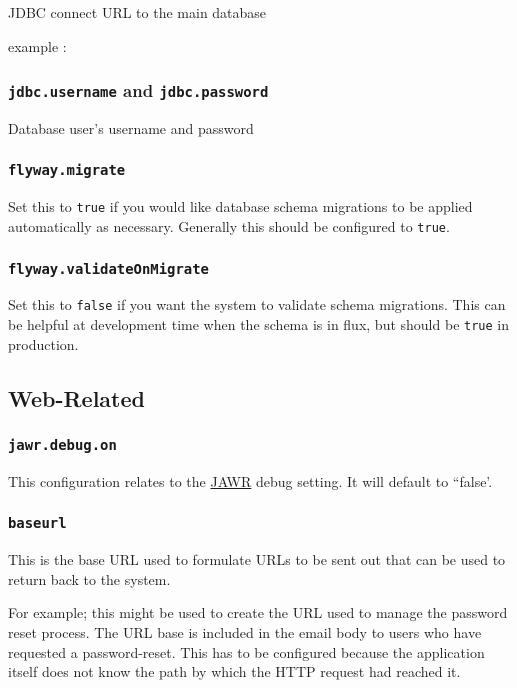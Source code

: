 JDBC connect URL to the main database

example : 

\subsubsection{{\tt jdbc.username} and {\tt jdbc.password}}

Database user's username and password

\subsubsection{\tt flyway.migrate}

Set this to {\tt true} if you would like database schema migrations to be applied automatically as necessary.  Generally this should be configured to {\tt true}.

\subsubsection{\tt flyway.validateOnMigrate}

Set this to {\tt false} if you want the system to validate schema migrations.  This can be helpful at development time when the schema is in flux, but should be {\tt true} in production.

\subsection{Web-Related}

\subsubsection{\tt jawr.debug.on}

This configuration relates to the \href{https://jawr.java.net/}{JAWR} debug setting.  It will default to ``false'.

\subsubsection{\tt baseurl}

This is the base URL used to formulate URLs to be sent out that can be used to return back to the system.

For example; this might be used to create the URL used to manage the password reset process.  The URL base is included in the email body to users who have requested a password-reset.  This has to be configured because the application itself does not know the path by which the HTTP request had reached it.

